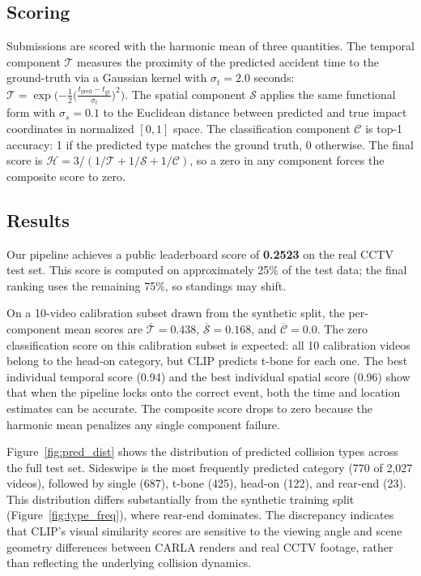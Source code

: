 \subsection{Scoring}

Submissions are scored with the harmonic mean of three quantities. The temporal component $\mathcal{T}$ measures the proximity of the predicted accident time to the ground-truth via a Gaussian kernel with $\sigma_t = 2.0$ seconds: $\mathcal{T} = \exp\!\big({-\tfrac{1}{2}}\big(\tfrac{t_{\text{pred}} - t_{\text{gt}}}{\sigma_t}\big)^{2}\big)$. The spatial component $\mathcal{S}$ applies the same functional form with $\sigma_s = 0.1$ to the Euclidean distance between predicted and true impact coordinates in normalized $[0,1]$ space. The classification component $\mathcal{C}$ is top-1 accuracy: 1 if the predicted type matches the ground truth, 0 otherwise. The final score is $\mathcal{H} = 3 / (1/\mathcal{T} + 1/\mathcal{S} + 1/\mathcal{C})$, so a zero in any component forces the composite score to zero.

\subsection{Results}

Our pipeline achieves a public leaderboard score of \textbf{0.2523} on the real CCTV test set. This score is computed on approximately 25\% of the test data; the final ranking uses the remaining 75\%, so standings may shift.

On a 10-video calibration subset drawn from the synthetic split, the per-component mean scores are $\overline{\mathcal{T}} = 0.438$, $\overline{\mathcal{S}} = 0.168$, and $\overline{\mathcal{C}} = 0.0$. The zero classification score on this calibration subset is expected: all 10 calibration videos belong to the head-on category, but CLIP predicts t-bone for each one. The best individual temporal score (0.94) and the best individual spatial score (0.96) show that when the pipeline locks onto the correct event, both the time and location estimates can be accurate. The composite score drops to zero because the harmonic mean penalizes any single component failure.

Figure~\ref{fig:pred_dist} shows the distribution of predicted collision types across the full test set. Sideswipe is the most frequently predicted category (770 of 2,027 videos), followed by single (687), t-bone (425), head-on (122), and rear-end (23). This distribution differs substantially from the synthetic training split (Figure~\ref{fig:type_freq}), where rear-end dominates. The discrepancy indicates that CLIP's visual similarity scores are sensitive to the viewing angle and scene geometry differences between CARLA renders and real CCTV footage, rather than reflecting the underlying collision dynamics.

